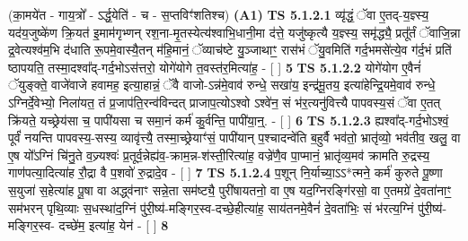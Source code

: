 \documentclass[17pt]{extarticle}
\begin{document}
                  \newline
                      (का॒मये॑त - गाय॒त्रो᳚ - ऽर्द्ध॒येति॑ - च - स॒प्तविꣳ॑शतिश्च)  \textbf{(A1)} \newline \newline
                                        \textbf{ TS 5.1.2.1} \newline
                  व्यृ॑द्धं॒ ॅवा ए॒तद्-य॒ज्ञ्स्य॒ यद॑य॒जुष्के॑ण क्रि॒यत॑ इ॒माम॑गृभ्णन् रश॒ना-मृ॒तस्येत्य॑श्वाभि॒धानी॒मा द॑त्ते॒ यजु॑ष्कृत्यै य॒ज्ञ्स्य॒ समृ॑द्ध्यै॒ प्रतू᳚र्तं ॅवाजि॒न्ना द्र॒वेत्यश्व॑म॒भि द॑धाति रू॒पमे॒वास्यै॒तन् म॑हि॒मानं॒ ॅव्याच॑ष्टे यु॒ञ्जाथाꣳ॒॒ रास॑भं ॅयु॒वमिति॑ गर्द॒भमसे॑त्ये॒व ग॑र्द॒भं प्रति॑ ष्ठापयति॒ तस्मा॒दश्वा᳚द्-गर्द॒भोऽस॑त्तरो॒ योगे॑योगे त॒वस्त॑र॒मित्या॑ह॒ - [  ] \textbf{  5} \newline
                  \newline
                                \textbf{ TS 5.1.2.2} \newline
                  योगे॑योग ए॒वैनं॑ ॅयुङ्क्ते॒ वाजे॑वाजे हवामह॒ इत्या॒हान्नं॒ ॅवै वाजो-ऽन्न॑मे॒वाव॑ रुन्धे॒ सखा॑य॒ इन्द्र॑मू॒तय॒ इत्या॑हेन्द्रि॒यमे॒वाव॑ रुन्धे॒ ऽग्निर्दे॒वेभ्यो॒ निला॑यत॒ तं प्र॒जाप॑ति॒रन्व॑विन्दत् प्राजाप॒त्योऽश्वो ऽश्वे॑न॒ सं भ॑र॒त्यनु॑वित्त्यै पापवस्य॒सं ॅवा ए॒तत् क्रि॑यते॒ यच्छ्रेय॑सा च॒ पापी॑यसा च समा॒नं कर्म॑ कु॒र्वन्ति॒ पापी॑या॒न्॒. - [  ] \textbf{  6} \newline
                  \newline
                                \textbf{ TS 5.1.2.3} \newline
                  ह्यश्वा᳚द्-गर्द॒भोऽश्वं॒ पूर्वं॑ नयन्ति पापवस्य॒-सस्य॒ व्यावृ॑त्त्यै॒ तस्मा॒च्छ्रेयाꣳ॑सं॒ पापी॑यान् प॒श्चादन्वे॑ति ब॒हुर्वै भव॑तो॒ भ्रातृ॑व्यो॒ भव॑तीव॒ खलु॒ वा ए॒ष यो᳚ऽग्निं चि॑नु॒ते व॒ज्र्यश्वः॑ प्र॒तूर्व॒न्नेह्य॑व॒-क्राम॒न्न-श॑स्ती॒रित्या॑ह॒ वज्रे॑णै॒व पा॒प्मानं॒ भ्रातृ॑व्य॒मव॑ क्रामति रु॒द्रस्य॒ गाण॑पत्या॒दित्या॑ह रौ॒द्रा वै प॒शवो॑ रु॒द्रादे॒व - [  ] \textbf{  7 } \newline
                  \newline
                                \textbf{ TS 5.1.2.4} \newline
                  प॒शून् नि॒र्याच्या॒ऽऽ*त्मने॒ कर्म॑ कुरुते पू॒ष्णा स॒युजा॑ स॒हेत्या॑ह पू॒षा वा अद्ध्व॑नाꣳ सन्ने॒ता सम॑ष्ट्यै॒ पुरी॑षायतनो॒ वा ए॒ष यद॒ग्निरङ्गि॑रसो॒ वा ए॒तमग्रे॑ दे॒वता॑नाꣳ॒॒ सम॑भरन् पृथि॒व्याः स॒धस्था॑द॒ग्निं पु॑री॒ष्य॑-मङ्गिर॒स्व-दच्छे॒हीत्या॑ह॒ साय॑तनमे॒वैनं॑ दे॒वता॑भिः॒ सं भ॑रत्य॒ग्निं पु॑री॒ष्य॑-मङ्गिर॒स्व- दच्छे॑म॒ इत्या॑ह॒ येन॑ - [  ] \textbf{  8} \newline
\end{document}
